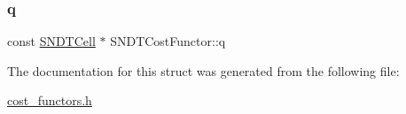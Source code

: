 \mbox{\label{structSNDTCostFunctor_a2e02683aa3af214e6d8bb7ca40b9f0b3}} 
\subsubsection{\texorpdfstring{q}{q}}
{\footnotesize\ttfamily const \hyperlink{classSNDTCell}{S\+N\+D\+T\+Cell} $\ast$ S\+N\+D\+T\+Cost\+Functor\+::q}



The documentation for this struct was generated from the following file\+:\begin{DoxyCompactItemize}
\item 
\hyperlink{cost__functors_8h}{cost\+\_\+functors.\+h}\end{DoxyCompactItemize}
